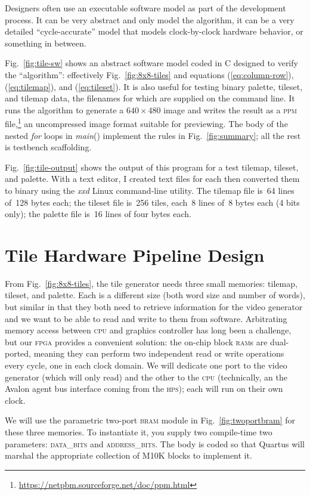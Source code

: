 \documentclass[11pt]{article}
\newcommand{\figref}[1]{Fig.~\ref{fig:#1}}
\newcommand{\equref}[1]{(\ref{eq:#1})}
\begin{document}
Designers often use an executable software model as part of the
development process.  It can be very abstract and only model the
algorithm, it can be a very detailed ``cycle-accurate'' model that
models clock-by-clock hardware behavior, or something in between.

\figref{tile-sw} shows an abstract software model coded in C designed
to verify the ``algorithm'': effectively \figref{8x8-tiles} and
equations \equref{column-row}, \equref{tilemap}, and \equref{tileset}.
It is also useful for testing binary palette, tileset, and tilemap
data, the filenames for which are supplied on the command line.  It
runs the algorithm to generate a $640\times480$ image and writes the
result as a \textsc{ppm}
file,\footnote{\url{https://netpbm.sourceforge.net/doc/ppm.html}} an
uncompressed image format suitable for previewing.  The body of the
nested \emph{for} loops in \emph{main}() implement the rules in
\figref{summary}; all the rest is testbench scaffolding.

\figref{tile-output} shows the output of this program for a test
tilemap, tileset, and palette.  With a text editor, I created text
files for each then converted them to binary using the \emph{xxd}
Linux command-line utility.  The tilemap file is~64 lines of~128 bytes
each; the tileset file is~256 tiles, each~8 lines of~8 bytes each (4
bits only); the palette file is~16 lines of four bytes each.

\section{Tile Hardware Pipeline Design}

From \figref{8x8-tiles}, the tile generator needs three small
memories: tilemap, tileset, and palette.  Each is a different size
(both word size and number of words), but similar in that they both
need to retrieve information for the video generator and we want to be
able to read and write to them from software.  Arbitrating memory
access between \textsc{cpu} and graphics controller has long been a
challenge, but our \textsc{fpga} provides a convenient solution: the
on-chip block \textsc{ram}s are dual-ported, meaning they can perform
two independent read or write operations every cycle, one in each
clock domain. We will dedicate one port to the video generator (which
will only read) and the other to the \textsc{cpu} (technically, an the
Avalon agent bus interface coming from the \textsc{hps}); each will
run on their own clock.

We will use the parametric two-port \textsc{bram} module in
\figref{twoportbram} for these three memories.  To instantiate it, you
supply two compile-time two parameters: \textsc{data\_bits} and
\textsc{address\_bits}.  The body is coded so that Quartus will
marshal the appropriate collection of M10K blocks to implement it.
\end{document}
